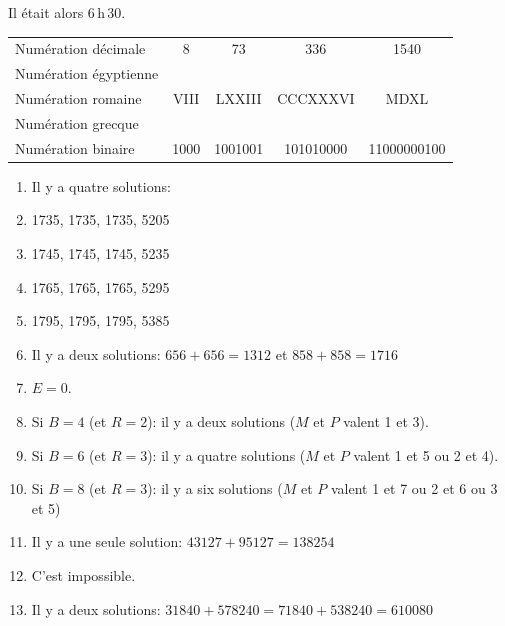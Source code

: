 \newpage

\vspace{-10pt}Il était alors 6\,h\,30.

\vspace{20pt}
\vspace{-5pt}\begin{tabularx}{\textwidth}{lCCCC}
Numération décimale & 8 & 73 & 336 & 1540 \\
Numération égyptienne   &  &  &  &  \\
Numération romaine   & VIII & LXXIII & CCCXXXVI & MDXL \\
Numération grecque   &  &  &  &  \\
Numération binaire   & 1000 & 1001001 & 101010000 & 11000000100 \\
\end{tabularx}

\vspace{20pt}
\vspace{-15pt}\begin{enumerate}[leftmargin=*,align=parleft, label=\alph*)]
\item Il y a quatre solutions:
\item[] 1735, 1735, 1735, 5205
\item[] 1745, 1745, 1745, 5235
\item[] 1765, 1765, 1765, 5295
\item[] 1795, 1795, 1795, 5385
\item Il y a deux solutions: $656+656=1312$ et $858+858=1716$
\item $E=0$.
\item[] Si $B=4$ (et $R=2$): il y a deux solutions ($M$ et $P$ valent 1 et 3).
\item[] Si $B=6$ (et $R=3$): il y a quatre solutions ($M$ et $P$ valent 1 et 5 ou 2 et 4).
\item[] Si $B=8$ (et $R=3$): il y a six solutions ($M$ et $P$ valent 1 et 7 ou 2 et 6 ou 3 et 5)
\item Il y a une seule solution: $43127+95127=138254$
\item C'est impossible.
\item Il y a deux solutions: $31840+578240=71840+538240=610080$
\end{enumerate}

